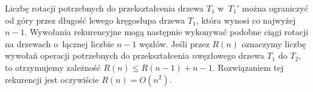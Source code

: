Liczbę rotacji potrzebnych do przekształcenia drzewa $T_1$ w~$T_1'$ można ograniczyć od góry przez długość lewego kręgosłupa drzewa $T_1$, która wynosi co najwyżej $n-1$.
Wywołania rekurencyjne mogą następnie wykonywać podobne ciągi rotacji na drzewach o~łącznej liczbie $n-1$ węzłów.
Jeśli przez $R(n)$ oznaczymy liczbę wywołań operacji  potrzebnych do przekształcenia $n$\nbhyphen węzłowego drzewa $T_1$ do $T_2$, to otrzymujemy zależność $R(n)\le R(n-1)+n-1$.
Rozwiązaniem tej rekurencji jest oczywiście $R(n)=O(n^2)$.
